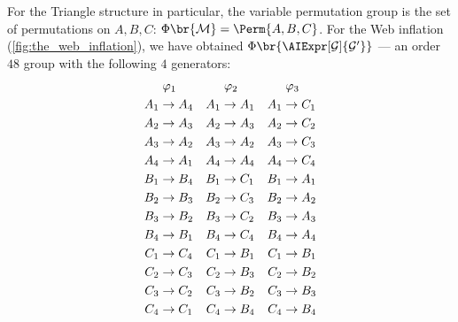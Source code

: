 \documentclass[aps, 10pt, english, twoside, pra, nofootinbib, tightenlines, longbibliography, superscriptaddress]{revtex4-1}
\begin{document}
    For the Triangle structure in particular, the variable permutation group is the set of permutations on $A, B, C$: $\Phi\br{\mscenario} = \Perm{A, B, C}$. For the Web inflation (\cref{fig:the_web_inflation}), we have obtained $\gp\br{\AIExpr[\graph]{\graph'}}$ --- an order $48$ group with the following $4$ generators:
    \begin{equation}
    \begin{aligned}[c]
    &\hspace{1mm}\varphi_1 \\
    A_1 &\to A_4 \\A_2 &\to A_3 \\A_3 &\to A_2 \\A_4 &\to A_1 \\B_1 &\to B_4 \\B_2 &\to B_3 \\B_3 &\to B_2 \\B_4 &\to B_1 \\C_1 &\to C_4 \\C_2 &\to C_3 \\C_3 &\to C_2 \\C_4 &\to C_1
    \end{aligned}
    \quad
    \begin{aligned}[c]
    &\hspace{1mm}\varphi_2 \\
    A_1 &\to A_1 \\A_2 &\to A_3 \\A_3 &\to A_2 \\A_4 &\to A_4 \\B_1 &\to C_1 \\B_2 &\to C_3 \\B_3 &\to C_2 \\B_4 &\to C_4 \\C_1 &\to B_1 \\C_2 &\to B_3 \\C_3 &\to B_2 \\C_4 &\to B_4
    \end{aligned}
    \quad
    \begin{aligned}[c]
    &\hspace{1mm}\varphi_3 \\
    A_1 &\to C_1 \\A_2 &\to C_2 \\A_3 &\to C_3 \\A_4 &\to C_4 \\B_1 &\to A_1 \\B_2 &\to A_2 \\B_3 &\to A_3 \\B_4 &\to A_4 \\C_1 &\to B_1 \\C_2 &\to B_2 \\C_3 &\to B_3 \\C_4 &\to B_4

\end{aligned}
\end{equation}
\end{document}
